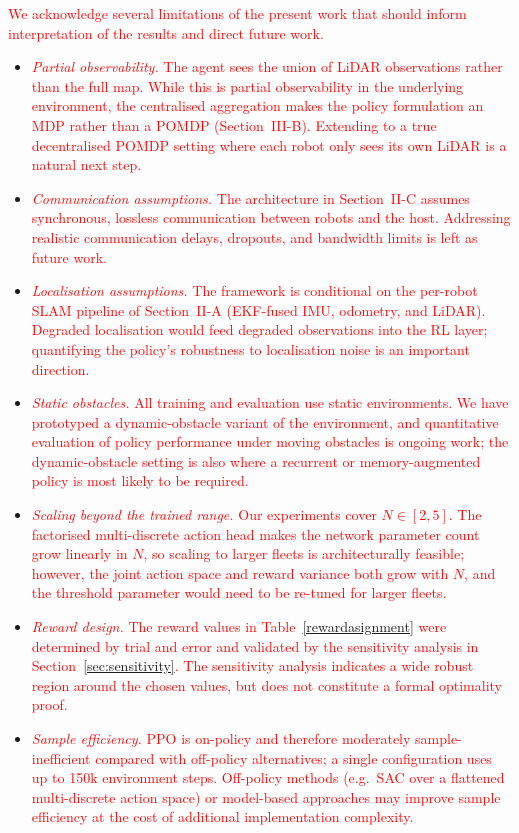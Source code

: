 \documentclass[journal]{IEEEtran}
\begin{document}
\textcolor{red}{We acknowledge several limitations of the present work that should inform interpretation of the results and direct future work.}
\begin{itemize}
\item \textcolor{red}{\emph{Partial observability.} The agent sees the union of LiDAR observations rather than the full map. While this is partial observability in the underlying environment, the centralised aggregation makes the policy formulation an MDP rather than a POMDP (Section~III-B). Extending to a true decentralised POMDP setting where each robot only sees its own LiDAR is a natural next step.}
\item \textcolor{red}{\emph{Communication assumptions.} The architecture in Section~II-C assumes synchronous, lossless communication between robots and the host. Addressing realistic communication delays, dropouts, and bandwidth limits is left as future work.}
\item \textcolor{red}{\emph{Localisation assumptions.} The framework is conditional on the per-robot SLAM pipeline of Section~II-A (EKF-fused IMU, odometry, and LiDAR). Degraded localisation would feed degraded observations into the RL layer; quantifying the policy's robustness to localisation noise is an important direction.}
\item \textcolor{red}{\emph{Static obstacles.} All training and evaluation use static environments. We have prototyped a dynamic-obstacle variant of the environment, and quantitative evaluation of policy performance under moving obstacles is ongoing work; the dynamic-obstacle setting is also where a recurrent or memory-augmented policy is most likely to be required.}
\item \textcolor{red}{\emph{Scaling beyond the trained range.} Our experiments cover $N \in [2, 5]$. The factorised multi-discrete action head makes the network parameter count grow linearly in $N$, so scaling to larger fleets is architecturally feasible; however, the joint action space and reward variance both grow with $N$, and the threshold parameter would need to be re-tuned for larger fleets.}
\item \textcolor{red}{\emph{Reward design.} The reward values in Table~\ref{rewardasignment} were determined by trial and error and validated by the sensitivity analysis in Section~\ref{sec:sensitivity}. The sensitivity analysis indicates a wide robust region around the chosen values, but does not constitute a formal optimality proof.}
\item \textcolor{red}{\emph{Sample efficiency.} PPO is on-policy and therefore moderately sample-inefficient compared with off-policy alternatives; a single configuration uses up to 150k environment steps. Off-policy methods (e.g.\ SAC over a flattened multi-discrete action space) or model-based approaches may improve sample efficiency at the cost of additional implementation complexity.}

\end{itemize}
\end{document}
